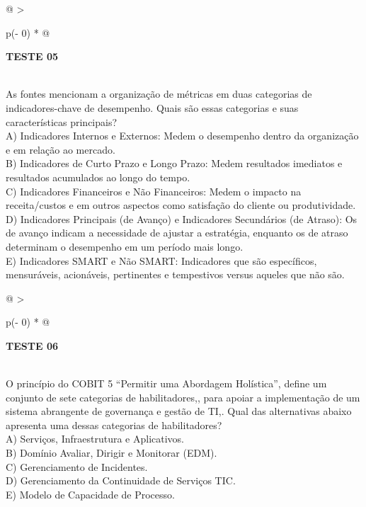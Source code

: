 \documentclass[
]{book}
\begin{document}
\begin{longtable}[]{@{}
  >{\raggedright\arraybackslash}p{(\columnwidth - 0\tabcolsep) * }@{}}
\toprule\noalign{}
\begin{minipage}[b]{\linewidth}\raggedright
\textbf{TESTE 05}
\end{minipage} \\
\midrule\noalign{}
\endhead
\bottomrule\noalign{}
\endlastfoot
As fontes mencionam a organização de métricas em duas categorias de indicadores-chave de desempenho. Quais são essas categorias e suas características principais? \\
A) Indicadores Internos e Externos: Medem o desempenho dentro da organização e em relação ao mercado. \\
B) Indicadores de Curto Prazo e Longo Prazo: Medem resultados imediatos e resultados acumulados ao longo do tempo. \\
C) Indicadores Financeiros e Não Financeiros: Medem o impacto na receita/custos e em outros aspectos como satisfação do cliente ou produtividade. \\
D) Indicadores Principais (de Avanço) e Indicadores Secundários (de Atraso): Os de avanço indicam a necessidade de ajustar a estratégia, enquanto os de atraso determinam o desempenho em um período mais longo. \\
E) Indicadores SMART e Não SMART: Indicadores que são específicos, mensuráveis, acionáveis, pertinentes e tempestivos versus aqueles que não são. \\
\end{longtable}

\begin{longtable}[]{@{}
  >{\raggedright\arraybackslash}p{(\columnwidth - 0\tabcolsep) * }@{}}
\toprule\noalign{}
\begin{minipage}[b]{\linewidth}\raggedright
\textbf{TESTE 06}
\end{minipage} \\
\midrule\noalign{}
\endhead
\bottomrule\noalign{}
\endlastfoot
O princípio do COBIT 5 ``Permitir uma Abordagem Holística'', define um conjunto de sete categorias de habilitadores,, para apoiar a implementação de um sistema abrangente de governança e gestão de TI,. Qual das alternativas abaixo apresenta uma dessas categorias de habilitadores? \\
A) Serviços, Infraestrutura e Aplicativos. \\
B) Domínio Avaliar, Dirigir e Monitorar (EDM). \\
C) Gerenciamento de Incidentes. \\
D) Gerenciamento da Continuidade de Serviços TIC. \\
E) Modelo de Capacidade de Processo. \\
\end{longtable}
\end{document}
